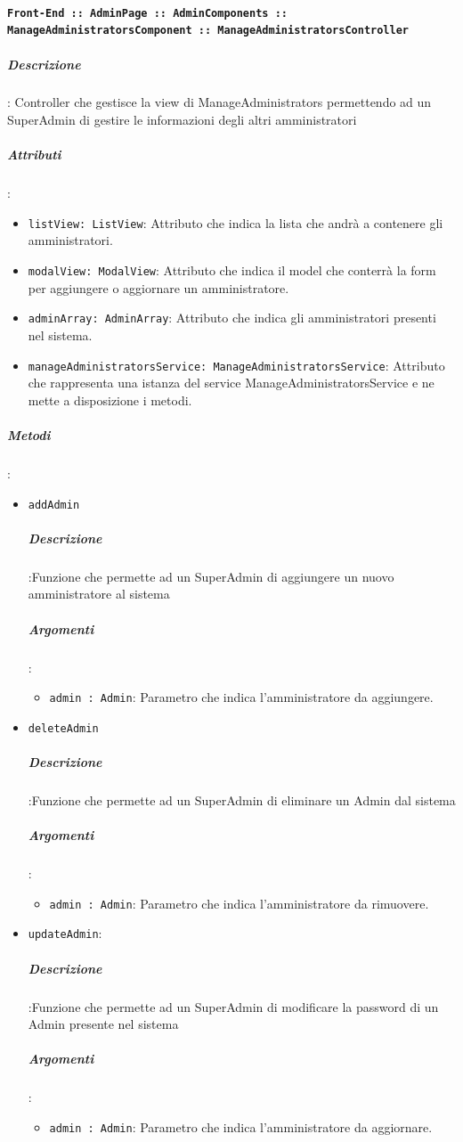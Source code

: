 \documentclass[../DefinizioneDiProdotto_v2.0.0.tex]{subfiles}
\begin{document}
				\paragraph{\texttt{Front-End :: AdminPage :: AdminComponents :: ManageAdministratorsComponent :: ManageAdministratorsController}}
		      		\subparagraph{Descrizione}: Controller che gestisce la view di ManageAdministrators permettendo ad un SuperAdmin di gestire le informazioni degli altri amministratori
			      	\subparagraph{Attributi}:
					\begin{itemize}
						\item \texttt{listView: ListView}: Attributo che indica la lista che andrà a contenere gli amministratori.
						\item \texttt{modalView: ModalView}: Attributo che indica il model che conterrà la form per aggiungere o aggiornare un amministratore.
						\item \texttt{adminArray: AdminArray}: Attributo che indica gli amministratori presenti nel sistema.
						\item \texttt{manageAdministratorsService: ManageAdministratorsService}: Attributo che rappresenta una istanza del service ManageAdministratorsService e ne mette a disposizione i metodi.
					\end{itemize}
			      	\subparagraph{Metodi}:
					\begin{itemize}
						\item \texttt{addAdmin}
						\subparagraph{Descrizione}:Funzione che permette ad un SuperAdmin di aggiungere un nuovo amministratore al sistema
						\subparagraph{Argomenti}:
						\begin{itemize}
							\item \texttt{admin : Admin}: Parametro che indica l'amministratore da aggiungere.
						\end{itemize}

						\item \texttt{deleteAdmin}
						\subparagraph{Descrizione}:Funzione che permette ad un SuperAdmin di eliminare un Admin dal sistema
						\subparagraph{Argomenti}:
						\begin{itemize}
							\item \texttt{admin : Admin}: Parametro che indica l'amministratore da rimuovere.
						\end{itemize}
						\item \texttt{updateAdmin}:
						\subparagraph{Descrizione}:Funzione che permette ad un SuperAdmin di modificare la password di un Admin presente nel sistema
						\subparagraph{Argomenti}:
						\begin{itemize}
							\item \texttt{admin : Admin}: Parametro che indica l'amministratore da aggiornare.
						\end{itemize}
					\end{itemize}
\end{document}

